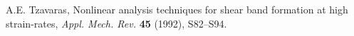 \documentclass[a4paper,11pt]{article}
\theoremstyle{remark}
\begin{document}
\begin{thebibliography}{10}

{\sc A.E. Tzavaras},
Nonlinear analysis techniques for shear band formation at high strain-rates,
{\it Appl. Mech. Rev.}
{\bf  45} (1992), S82--S94.



%
%


%
%
%
%

%
%
%
%
%
%
%
%


\end{thebibliography}
\end{document}

